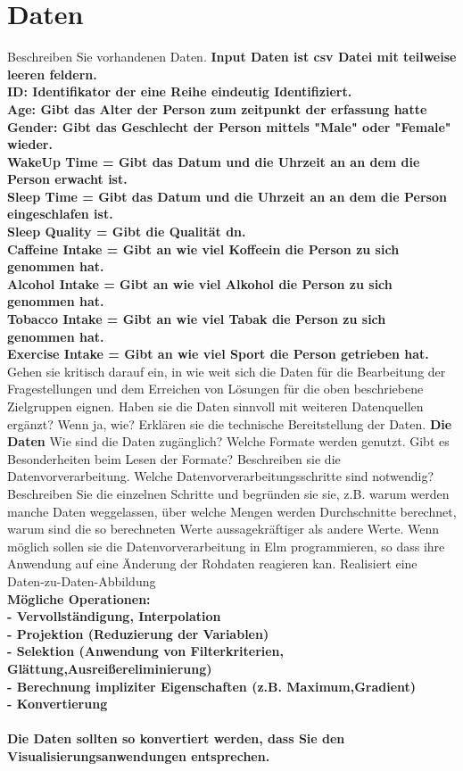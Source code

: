 \documentclass[usegeometry=true]{scrartcl}
\begin{document}
\section{Daten}
Beschreiben Sie vorhandenen Daten. 
\textbf {Input Daten ist csv Datei mit teilweise leeren feldern.\\ ID: Identifikator der eine Reihe eindeutig Identifiziert.\\ Age: Gibt das Alter der Person zum zeitpunkt der erfassung hatte\\ Gender: Gibt das Geschlecht der Person mittels "Male" oder "Female" wieder. \\ WakeUp Time = Gibt das Datum und die Uhrzeit an an dem die Person erwacht ist.  \\ Sleep Time = Gibt das Datum und die Uhrzeit an an dem die Person eingeschlafen ist. \\ Sleep Quality = Gibt die Qualität dn. \\ Caffeine Intake = Gibt an wie viel Koffeein die Person zu sich genommen hat. \\ Alcohol Intake = Gibt an wie viel Alkohol die Person zu sich genommen hat. \\ Tobacco Intake = Gibt an wie viel Tabak die Person zu sich genommen hat. \\ Exercise Intake = Gibt an wie viel Sport die Person getrieben hat. \\ }
Gehen sie kritisch darauf ein, in wie weit sich die Daten für die Bearbeitung der Fragestellungen und dem Erreichen von Lösungen für die oben beschriebene Zielgruppen eignen. Haben sie die Daten sinnvoll mit weiteren Datenquellen ergänzt? Wenn ja, wie?
Erklären sie die technische Bereitstellung der Daten.
\textbf { Die Daten }
Wie sind die Daten zugänglich? Welche Formate werden genutzt. Gibt es Besonderheiten beim Lesen der Formate?
Beschreiben sie die Datenvorverarbeitung.
 Welche Datenvorverarbeitungsschritte sind notwendig? Beschreiben Sie die einzelnen Schritte und begründen sie sie, z.B. warum werden manche Daten weggelassen, über welche Mengen werden Durchschnitte berechnet, warum sind die so berechneten Werte aussagekräftiger als andere Werte. Wenn möglich sollen sie die Datenvorverarbeitung in Elm programmieren, so dass ihre Anwendung auf eine Änderung der Rohdaten reagieren kan.
 Realisiert eine Daten-zu-Daten-Abbildung\\
 \textbf { Mögliche Operationen:\\
    - Vervollständigung, Interpolation\\
    - Projektion (Reduzierung der Variablen)\\
    - Selektion (Anwendung von Filterkriterien, Glättung,Ausreißereliminierung)\\
    - Berechnung impliziter Eigenschaften (z.B. Maximum,Gradient)\\
    - Konvertierung\\
    \\
    Die Daten sollten so konvertiert werden, dass Sie den Visualisierungsanwendungen entsprechen. 
 }
\end{document}
